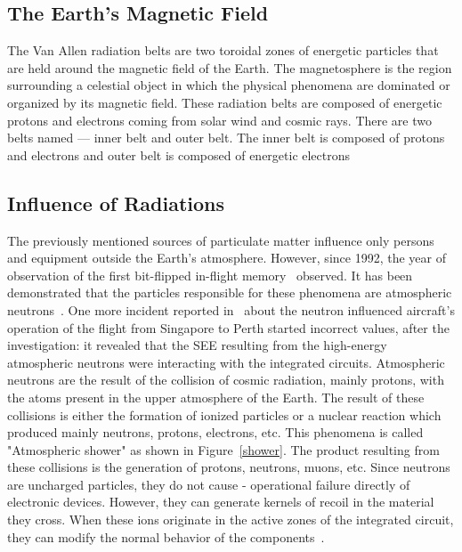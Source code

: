 \subsection{The Earth's Magnetic Field}

The Van Allen radiation belts are two toroidal zones of energetic particles that are held around the magnetic field of the Earth. The magnetosphere is the region surrounding a celestial object in which the
physical phenomena are dominated or organized by its magnetic field. These radiation belts are composed of energetic protons and electrons coming from solar wind and cosmic rays. There are two belts named --- inner belt and outer belt. The inner belt is composed of protons and electrons and outer belt is composed of energetic electrons~\citep{barth2003space}


\subsection{Influence of Radiations}
The previously mentioned sources of particulate matter influence only persons and equipment
outside the Earth's atmosphere. However, since 1992, the year of observation of the first
bit-flipped in-flight memory~\citep{taber1995investigation, taber1993single} observed. It has been demonstrated that the particles responsible for these
phenomena are atmospheric neutrons~\citep{leray2004atmospheric, jedec2006measurement}.
One more incident reported in~\cite{SWE2016} about the neutron influenced aircraft's operation of the flight from Singapore to Perth started incorrect values, after the investigation: it revealed that the SEE resulting from the high-energy atmospheric neutrons were interacting with the integrated circuits.
Atmospheric neutrons are the result of the collision of cosmic radiation,
mainly protons, with the atoms present in the upper atmosphere of the Earth. The result of these collisions is either the formation of ionized particles or a nuclear reaction which
produced mainly neutrons, protons, electrons, etc. This phenomena is called
"Atmospheric shower" as shown in Figure~\ref{shower}. The product resulting from these collisions is the generation of
protons, neutrons, muons, etc. Since neutrons are uncharged particles, they do not
cause  - operational failure directly of electronic devices. However, they can generate kernels of recoil in
the material they cross. When these ions originate in the active zones of the integrated circuit, they can modify the normal behavior of the components~\cite{normand1998extensions}.
%



